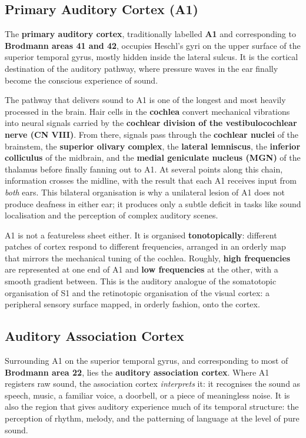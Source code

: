 \documentclass[11pt]{article}
\begin{document}
\subsection{Primary Auditory Cortex (A1)}

The \textbf{primary auditory cortex}, traditionally labelled \textbf{A1} and corresponding to \textbf{Brodmann areas 41 and 42}, occupies Heschl's gyri on the upper surface of the superior temporal gyrus, mostly hidden inside the lateral sulcus. It is the cortical destination of the auditory pathway, where pressure waves in the ear finally become the conscious experience of sound.

The pathway that delivers sound to A1 is one of the longest and most heavily processed in the brain. Hair cells in the \textbf{cochlea} convert mechanical vibrations into neural signals carried by the \textbf{cochlear division of the vestibulocochlear nerve (CN VIII)}. From there, signals pass through the \textbf{cochlear nuclei} of the brainstem, the \textbf{superior olivary complex}, the \textbf{lateral lemniscus}, the \textbf{inferior colliculus} of the midbrain, and the \textbf{medial geniculate nucleus (MGN)} of the thalamus before finally fanning out to A1. At several points along this chain, information crosses the midline, with the result that each A1 receives input from \textit{both} ears. This bilateral organisation is why a unilateral lesion of A1 does not produce deafness in either ear; it produces only a subtle deficit in tasks like sound localisation and the perception of complex auditory scenes.

A1 is not a featureless sheet either. It is organised \textbf{tonotopically}: different patches of cortex respond to different frequencies, arranged in an orderly map that mirrors the mechanical tuning of the cochlea. Roughly, \textbf{high frequencies} are represented at one end of A1 and \textbf{low frequencies} at the other, with a smooth gradient between. This is the auditory analogue of the somatotopic organisation of S1 and the retinotopic organisation of the visual cortex: a peripheral sensory surface mapped, in orderly fashion, onto the cortex.

\subsection{Auditory Association Cortex}

Surrounding A1 on the superior temporal gyrus, and corresponding to most of \textbf{Brodmann area 22}, lies the \textbf{auditory association cortex}. Where A1 registers raw sound, the association cortex \textit{interprets} it: it recognises the sound as speech, music, a familiar voice, a doorbell, or a piece of meaningless noise. It is also the region that gives auditory experience much of its temporal structure: the perception of rhythm, melody, and the patterning of language at the level of pure sound.
\end{document}
